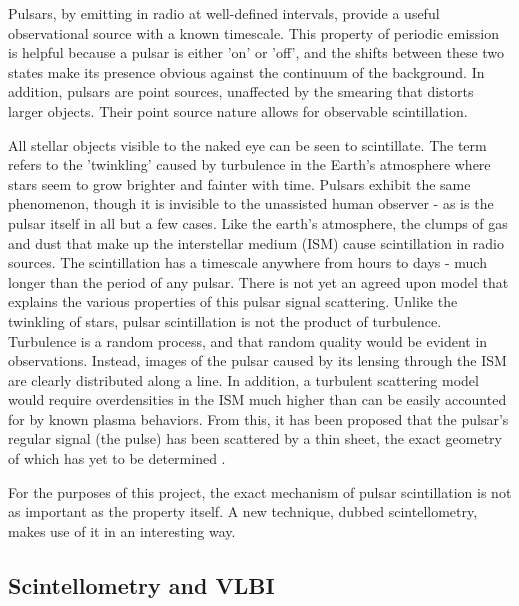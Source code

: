 \documentclass[a4paper,12pt]{article}
\begin{document}
Pulsars, by emitting in radio at well-defined intervals, provide a useful observational source with a known timescale. This property of periodic emission is helpful because a pulsar is either 'on' or 'off', and the shifts between these two states make its presence obvious against the continuum of the background. In addition, pulsars are point sources, unaffected by the smearing that distorts larger objects. Their point source nature allows for observable scintillation. 

All stellar objects visible to the naked eye can be seen to scintillate. The term refers to the 'twinkling' caused by turbulence in the Earth's atmosphere where stars seem to grow brighter and fainter with time. Pulsars exhibit the same phenomenon, though it is invisible to the unassisted human observer - as is the pulsar itself in all but a few cases. Like the earth's atmosphere, the clumps of gas and dust that make up the interstellar medium (ISM) cause scintillation in radio sources. The scintillation has a timescale anywhere from hours to days - much longer than the period of any pulsar. There is not yet an agreed upon model that explains the various properties of this pulsar signal scattering. Unlike the twinkling of stars, pulsar scintillation is not the product of turbulence\citep{interstellarholography}. Turbulence is a random process, and that random quality would be evident in observations. Instead, images of the pulsar caused by its lensing through the ISM are clearly distributed along a line. In addition, a turbulent scattering model would require overdensities in the ISM much higher than can be easily accounted for by known plasma behaviors. From this, it has been proposed that the pulsar's regular signal (the pulse) has been scattered by a thin sheet, the exact geometry of which has yet to be determined \citep{plasmalenses}.

For the purposes of this project, the exact mechanism of pulsar scintillation is not as important as the property itself. A new technique, dubbed scintellometry, makes use of it in an interesting way.


\subsection{Scintellometry and VLBI}
\label{sec:scintellometry}
\end{document}
